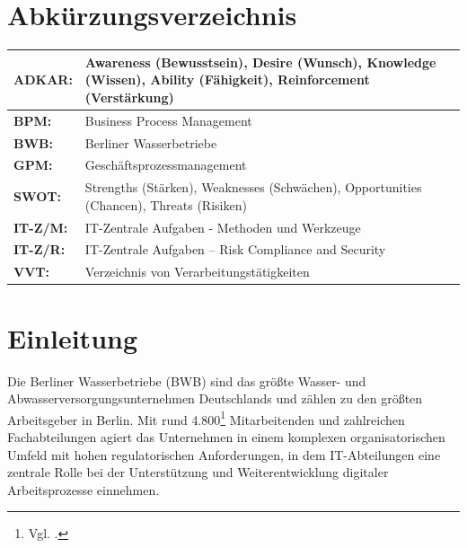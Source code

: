 \documentclass[
    12pt, 
    a4paper,
    ]{scrartcl} %
\begin{document}
\newpage
\section*{Abkürzungsverzeichnis}  
\vspace{0.6cm}
\begin{tabular}{p{4cm} p{11.35cm}}   
    \textbf{\normalsize ADKAR:} & \normalsize Awareness (Bewusstsein), Desire (Wunsch), Knowledge (Wissen), Ability (Fähigkeit), Reinforcement (Verstärkung) \\[0.5cm]
    \hline
    \textbf{\normalsize BPM:} & \normalsize Business Process Management \\[0.5cm]
    \hline
    \textbf{\normalsize BWB:} & \normalsize Berliner Wasserbetriebe \\[0.5cm]
    \hline
    \textbf{\normalsize GPM:} & \normalsize Geschäftsprozessmanagement \\[0.5cm]
    \hline 
    \textbf{\normalsize SWOT:} & \normalsize Strengths (Stärken), Weaknesses (Schwächen), Opportunities (Chancen), Threats (Risiken) \\[0.5cm]
    \hline 
    \textbf{\normalsize IT-Z/M:} & \normalsize IT-Zentrale Aufgaben - Methoden und Werkzeuge \\[0.5cm]
    \hline
    \textbf{\normalsize IT-Z/R:} & \normalsize IT-Zentrale Aufgaben – Risk Compliance and Security \\[0.5cm]
    \hline
    \textbf{\normalsize VVT:} & \normalsize Verzeichnis von Verarbeitungstätigkeiten \\[0.5cm]
 \end{tabular}

\newpage
{} %
\setcounter{page}{1}
\section{Einleitung}
Die Berliner Wasserbetriebe (BWB) sind das größte Wasser- und Abwasserversorgungsunternehmen Deutschlands und zählen zu den größten Arbeitsgeber in Berlin. Mit rund 4.800\footnote{Vgl. \cite{BWB_Arbeitgeber}.} Mitarbeitenden und zahlreichen Fachabteilungen agiert das Unternehmen in einem komplexen organisatorischen Umfeld mit hohen regulatorischen Anforderungen, in dem IT-Abteilungen eine zentrale Rolle bei der Unterstützung und Weiterentwicklung digitaler Arbeitsprozesse einnehmen.
\end{document}
